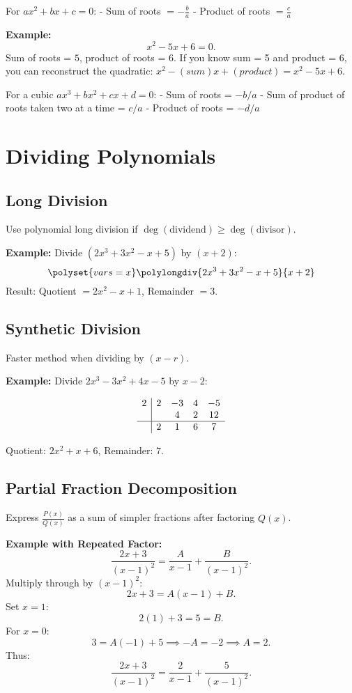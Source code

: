 \documentclass{article}
\begin{document}
\begin{multicols}{2}
For \(ax^2+bx+c=0\):
- Sum of roots \(= -\frac{b}{a}\)
- Product of roots \(= \frac{c}{a}\)

\textbf{Example:}
\[
x^2-5x+6=0.
\]
Sum of roots = \(5\), product of roots = \(6\). If you know sum = 5 and product = 6, you can reconstruct the quadratic: \(x^2 - (sum)x + (product)=x^2-5x+6\).

For a cubic \(ax^3+bx^2+cx+d=0\):
- Sum of roots = \(-b/a\)
- Sum of product of roots taken two at a time = \(c/a\)
- Product of roots = \(-d/a\)

\columnbreak

\section*{Dividing Polynomials}

\subsection*{Long Division}
Use polynomial long division if \(\deg(\text{dividend}) \geq \deg(\text{divisor})\).

\textbf{Example:}
Divide \((2x^3+3x^2 - x +5)\) by \((x+2)\):
\[
\polyset{vars=x}
\polylongdiv{2x^3+3x^2 - x +5}{x+2}
\]
Result: Quotient \(= 2x^2 - x + 1\), Remainder \(= 3\).

\subsection*{Synthetic Division}
Faster method when dividing by \((x-r)\).

\textbf{Example:}
Divide \(2x^3-3x^2+4x-5\) by \(x-2\):

\[
\begin{array}{c|cccc}
2 & 2 & -3 & 4 & -5 \\
  &   & 4  & 2 & 12 \\
\hline
  & 2 & 1  & 6 & 7
\end{array}
\]

Quotient: \(2x^2+x+6\), Remainder: \(7\).

\subsection*{Partial Fraction Decomposition}
Express \(\frac{P(x)}{Q(x)}\) as a sum of simpler fractions after factoring \(Q(x)\).

\textbf{Example with Repeated Factor:}
\[
\frac{2x+3}{(x-1)^2}=\frac{A}{x-1}+\frac{B}{(x-1)^2}.
\]
Multiply through by \((x-1)^2\):
\[
2x+3=A(x-1)+B.
\]
Set \(x=1\):
\[
2(1)+3=5=B.
\]
For \(x=0\):
\[
3=A(-1)+5 \implies -A= -2 \implies A=2.
\]
Thus:
\[
\frac{2x+3}{(x-1)^2}=\frac{2}{x-1}+\frac{5}{(x-1)^2}.
\]


\end{multicols}
\end{document}
